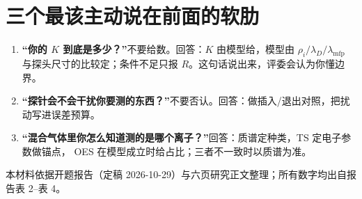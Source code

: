 \documentclass[11pt,a4paper]{ctexart}
\begin{document}
\section{三个最该主动说在前面的软肋}

\begin{enumerate}[leftmargin=1.6em,itemsep=3pt]
\item \textbf{“你的 $K$ 到底是多少？”}\quad 不要给数。回答：$K$ 由模型给，模型由
$\rho_i/\lambda_D/\lambda_{\mathrm{mfp}}$ 与探头尺寸的比较定；条件不足只报 $R$。这句话说出来，评委会认为你懂边界。
\item \textbf{“探针会不会干扰你要测的东西？”}\quad 不要否认。回答：做插入/退出对照，把扰动写进误差预算。
\item \textbf{“混合气体里你怎么知道测的是哪个离子？”}\quad 回答：质谱定种类，TS 定电子参数做锚点，
OES 在模型成立时给占比；三者不一致时以质谱为准。
\end{enumerate}

\vfill
\begin{center}
{\small\color{accent}本材料依据开题报告（定稿 2026-10-29）与六页研究正文整理；所有数字均出自报告表 2--表 4。}
\end{center}
\end{document}
